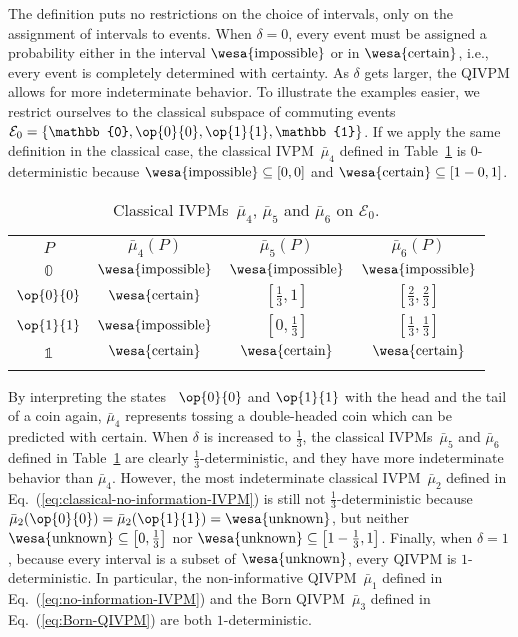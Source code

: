 \documentclass[english,reprint, aps, prl,superscriptaddress, showpacs,
showkeys, longbibliography, amsmath, amssymb, floatfix]{revtex4-1}
\theoremstyle{plain}
\theoremstyle{definition}
\newcommand{\events}{\ensuremath{\mathcal{E}}}
\newcommand{\imposs}{{\text{\wesa{impossible}}}}
\newcommand{\necess}{{\text{\wesa{certain}}}}
\newcommand{\unknown}{{\text{\wesa{unknown}}}}
\newcommand{\proj}[1]{\op{#1}{#1}}
\begin{document}
\noindent The definition puts no restrictions on the choice of intervals,
only on the assignment of intervals to events. When $\delta=0$, every
event must be assigned a probability either in the interval $\imposs$
or in $\necess$, i.e., every event is completely determined with
certainty. As $\delta$ gets larger, the QIVPM allows for more indeterminate
behavior. To illustrate the examples easier, we restrict ourselves
to the classical subspace of commuting events~$\events_{0}=\left\{ \mathbb{0},\proj{0},\proj{1},\mathbb{1}\right\} $.
If we apply the same definition in the classical case, the classical
IVPM~$\bar{\mu}_{4}$ defined in Table~\ref{tab:classical-IVPMs}
is $0$-deterministic because $\imposs\subseteq\left[0,0\right]$
and $\necess\subseteq\left[1-0,1\right]$.
\begin{table}
\noindent \centering{}\caption{\label{tab:classical-IVPMs}Classical IVPMs~$\bar{\mu}_{4}$, $\bar{\mu}_{5}$
and $\bar{\mu}_{6}$ on $\events_{0}$.}
\begin{tabular}{cccc}
\toprule 
\addlinespace
$P$ & $\bar{\mu}_{4}(P)$ & $\bar{\mu}_{5}(P)$ & $\bar{\mu}_{6}(P)$\tabularnewline\addlinespace
\midrule
\midrule 
\addlinespace
$\mathbb{0}$ & $\imposs$ & $\imposs$ & $\imposs$\tabularnewline\addlinespace
\midrule 
\addlinespace
$\proj{0}$ & $\necess$ & $\left[\frac{1}{3},1\right]$ & $\left[\frac{2}{3},\frac{2}{3}\right]$\tabularnewline\addlinespace
\midrule 
\addlinespace
$\proj{1}$ & $\imposs$ & $\left[0,\frac{1}{3}\right]$ & $\left[\frac{1}{3},\frac{1}{3}\right]$\tabularnewline\addlinespace
\midrule 
\addlinespace
$\mathbb{1}$ & $\necess$ & $\necess$ & $\necess$\tabularnewline\addlinespace
\bottomrule
\end{tabular}
\end{table}
By interpreting the states ~$\proj{0}$ and $\proj{1}$ with the
head and the tail of a coin again, $\bar{\mu}_{4}$ represents tossing
a double-headed coin which can be predicted with certain. When $\delta$
is increased to $\frac{1}{3}$, the classical IVPMs~$\bar{\mu}_{5}$
and $\bar{\mu}_{6}$ defined in Table~\ref{tab:classical-IVPMs}
are clearly $\frac{1}{3}$-deterministic, and they have more indeterminate
behavior than $\bar{\mu}_{4}$. However, the most indeterminate classical
IVPM~$\bar{\mu}_{2}$ defined in Eq.~(\ref{eq:classical-no-information-IVPM})
is still not $\frac{1}{3}$-deterministic because $\bar{\mu}_{2}(\proj{0})=\bar{\mu}_{2}(\proj{1})=\unknown$,
but neither $\unknown\subseteq\left[0,\frac{1}{3}\right]$ nor $\unknown\subseteq\left[1-\frac{1}{3},1\right]$.
Finally, when $\delta=1$, because every interval is a subset of $\unknown$,
every QIVPM is $1$-deterministic. In particular, the non-informative
QIVPM~$\bar{\mu}_{1}$ defined in Eq.~(\ref{eq:no-information-IVPM})
and the Born QIVPM~$\bar{\mu}_{3}$ defined in Eq.~(\ref{eq:Born-QIVPM})
are both $1$-deterministic.
\end{document}
